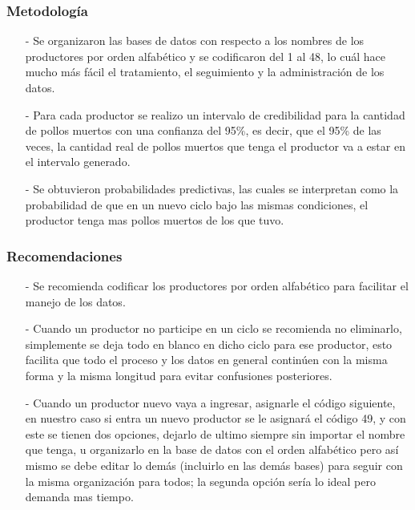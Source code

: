 \documentclass[11pt]{beamer}
\begin{document}
\begin{frame}
\frametitle{Metodología}
\begin{itemize}
\item[-]Se organizaron las bases de datos con respecto a los nombres de los productores por orden alfabético y se codificaron del 1 al 48, lo cuál hace mucho más fácil el tratamiento, el seguimiento y la administración de los datos.
\item[-]Para cada productor se realizo un intervalo de credibilidad para la cantidad de pollos muertos con una confianza del 95\%, es decir, que el 95\% de las veces, la cantidad real de pollos muertos que tenga el productor va a estar en el intervalo generado.
\item[-]Se obtuvieron probabilidades predictivas, las cuales se interpretan como la probabilidad de que en un nuevo ciclo bajo las mismas condiciones, el productor tenga mas pollos muertos de los que tuvo.
\end{itemize}
\end{frame}

\begin{frame}
\frametitle{Recomendaciones}
\begin{itemize}
\item[-]Se recomienda codificar los productores por orden alfabético para facilitar el manejo de los datos.
\item[-]Cuando un productor no participe en un ciclo se recomienda no eliminarlo, simplemente se deja todo en blanco en dicho ciclo para ese productor, esto facilita que todo el proceso y los datos en general continúen con la misma forma y la misma longitud para evitar confusiones posteriores.
\item[-]Cuando un productor nuevo vaya a ingresar, asignarle el código siguiente, en nuestro caso si entra un nuevo productor se le asignará el código 49, y con este se tienen dos opciones, dejarlo de ultimo siempre sin importar el nombre que tenga, u organizarlo en la base de datos con el orden alfabético pero así mismo se debe editar lo demás (incluirlo en las demás bases) para seguir con la misma organización para todos; la segunda opción sería lo ideal pero demanda mas tiempo.
\end{itemize}
\end{frame}
\end{document}
